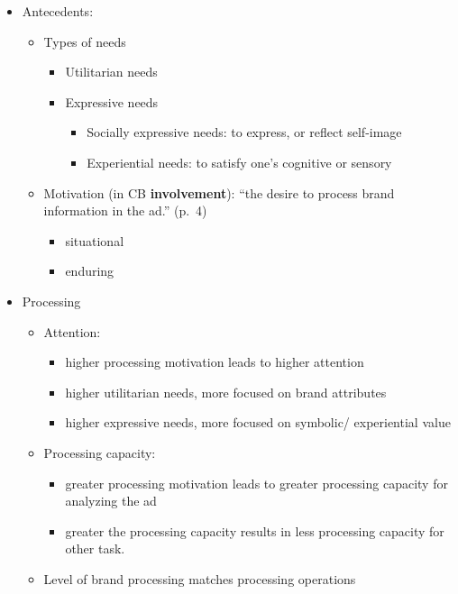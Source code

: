 \documentclass[
]{book}
\begin{document}
\begin{itemize}
\item
  Antecedents:

  \begin{itemize}
  \item
    Types of needs

    \begin{itemize}
    \item
      Utilitarian needs
    \item
      Expressive needs

      \begin{itemize}
      \item
        Socially expressive needs: to express, or reflect self-image
      \item
        Experiential needs: to satisfy one's cognitive or sensory
      \end{itemize}
    \end{itemize}
  \item
    Motivation (in CB \textbf{involvement}): ``the desire to process brand information in the ad.'' (p.~4)

    \begin{itemize}
    \item
      situational
    \item
      enduring
    \end{itemize}
  \end{itemize}
\item
  Processing

  \begin{itemize}
  \item
    Attention:

    \begin{itemize}
    \item
      higher processing motivation leads to higher attention
    \item
      higher utilitarian needs, more focused on brand attributes
    \item
      higher expressive needs, more focused on symbolic/ experiential value
    \end{itemize}
  \item
    Processing capacity:

    \begin{itemize}
    \item
      greater processing motivation leads to greater processing capacity for analyzing the ad
    \item
      greater the processing capacity results in less processing capacity for other task.
    \end{itemize}
  \item
    Level of brand processing matches processing operations


\end{itemize}
\end{itemize}
\end{document}
